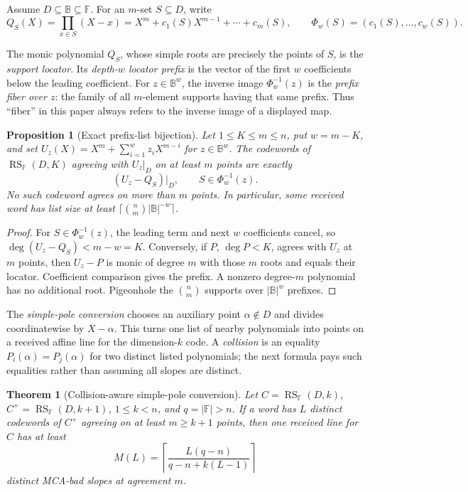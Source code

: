 \documentclass[11pt,a4paper]{amsart}
\numberwithin{equation}{section}
\newtheorem{theorem}{Theorem}[section]
\newtheorem{proposition}[proposition]{Proposition}
\theoremstyle{remark}
\DeclareMathOperator{\RS}{RS}
\newcommand{\F}{\mathbb F}
\newcommand{\B}{\mathbb B}
\newcommand{\abs}[1]{\lvert #1\rvert}
\begin{document}
Assume \(D\subseteq\B\subseteq\F\).  For an \(m\)-set \(S\subseteq D\),
write
\[
 Q_S(X)=\prod_{x\in S}(X-x)
       =X^m+c_1(S)X^{m-1}+\cdots+c_m(S),
 \qquad
 \Phi_w(S)=(c_1(S),\ldots,c_w(S)).
\]

The monic polynomial \(Q_S\), whose simple roots are precisely the points
of \(S\), is the \emph{support locator}.  Its \emph{depth-\(w\) locator
prefix} is the vector of the first \(w\) coefficients below the leading
coefficient.  For \(z\in\B^w\), the inverse image
\(\Phi_w^{-1}(z)\) is the \emph{prefix fiber over \(z\)}: the family of
all \(m\)-element supports having that same prefix.  Thus ``fiber'' in this
paper always refers to the inverse image of a displayed map.

\begin{proposition}[Exact prefix-list bijection]\label{prop:exact-prefix-list}
Let \(1\le K\le m\le n\), put \(w=m-K\), and set
\(U_z(X)=X^m+\sum_{i=1}^wz_iX^{m-i}\) for \(z\in\B^w\).  The codewords of
\(\RS_\F(D,K)\) agreeing with \(U_z|_D\) on at least \(m\) points are
exactly
\[
        (U_z-Q_S)|_D,\qquad S\in\Phi_w^{-1}(z).
 \tag{4.1}\label{eq:prefix-bijection}
\]
No such codeword agrees on more than \(m\) points.  In particular, some
received word has list size at least
\(\lceil\binom nm\abs\B^{-w}\rceil\).
\end{proposition}

\begin{proof}
For \(S\in\Phi_w^{-1}(z)\), the leading term and next \(w\) coefficients
cancel, so \(\deg(U_z-Q_S)<m-w=K\).  Conversely, if \(P\), \(\deg P<K\),
agrees with \(U_z\) at \(m\) points, then \(U_z-P\) is monic of degree
\(m\) with those \(m\) roots and equals their locator.  Coefficient
comparison gives the prefix.  A nonzero degree-\(m\) polynomial has no
additional root.  Pigeonhole the \(\binom nm\) supports over
\(\abs\B^w\) prefixes.
\end{proof}

The \emph{simple-pole conversion} chooses an auxiliary point
\(\alpha\notin D\) and divides coordinatewise by \(X-\alpha\).  This
turns one list of nearby polynomials into points on a received affine line
for the dimension-\(k\) code.  A \emph{collision} is an equality
\(P_i(\alpha)=P_j(\alpha)\) for two distinct listed polynomials; the next
formula pays such equalities rather than assuming all slopes are distinct.

\begin{theorem}[Collision-aware simple-pole conversion]
\label{thm:collision-aware-pole}
Let \(C=\RS_\F(D,k)\), \(C^+=\RS_\F(D,k+1)\), \(1\le k<n\), and
\(q=\abs\F>n\).  If a word has \(L\) distinct codewords of \(C^+\)
agreeing on at least \(m\ge k+1\) points, then one received line for \(C\)
has at least
\[
 M(L)=\left\lceil
 \frac{L(q-n)}{q-n+k(L-1)}
 \right\rceil
 \tag{4.2}\label{eq:collision-aware-pole}
\]
distinct MCA-bad slopes at agreement \(m\).
\end{theorem}
\end{document}
